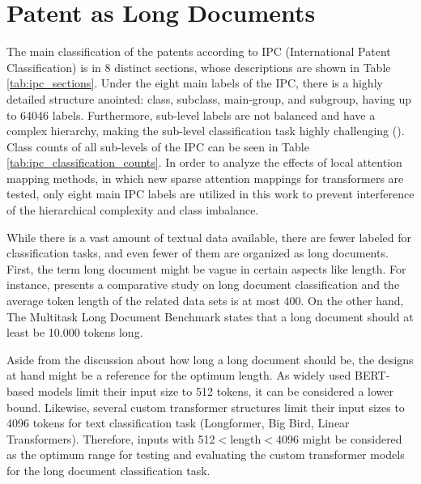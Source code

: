 \documentclass{iyte}
\begin{document}


\section{Patent as Long Documents}

The main classification of the patents according to IPC (International Patent Classification) is in 8 distinct sections, whose descriptions are shown in Table \ref{tab:ipc_sections}. Under the eight main labels of the IPC, there is a highly detailed structure anointed: class, subclass, main-group, and subgroup, having up to 64046 labels. Furthermore, sub-level labels are not balanced and have a complex hierarchy, making the sub-level classification task highly challenging (\citealt{patent_classification_book_survey}). Class counts of all sub-levels of the IPC can be seen in Table \ref{tab:ipc_classification_counts}. In order to analyze the effects of local attention mapping methods, in which new sparse attention mappings for transformers are tested, only eight main IPC labels are utilized in this work to prevent interference of the hierarchical complexity and class imbalance.

While there is a vast amount of textual data available, there are fewer labeled for classification tasks, and even fewer of them are organized as long documents. First, the term long document might be vague in certain aspects like length. For instance, \cite{survey_long_text_comparative} presents a comparative study on long document classification and the average token length of the related data sets is at most 400. On the other hand, The Multitask Long Document Benchmark \cite{benchmark_MuLD} states that a long document should at least be 10.000 tokens long.



Aside from the discussion about how long a long document should be, the designs at hand might be a reference for the optimum length. As widely used BERT-based models limit their input size to 512 tokens, it can be considered a lower bound. Likewise, several custom transformer structures limit their input sizes to 4096 tokens for text classification task (Longformer, Big Bird, Linear Transformers). Therefore, inputs with 512$<$length$<$4096 might be considered as the optimum range for testing and evaluating the custom transformer models for the long document classification task.
\end{document}
